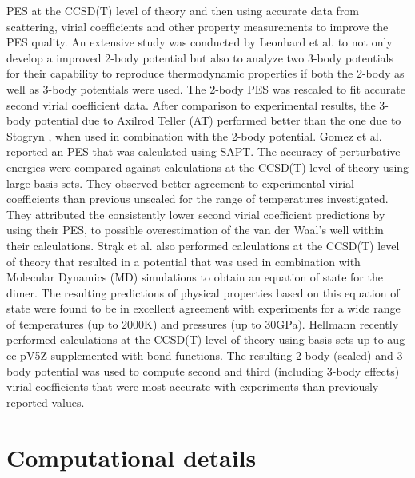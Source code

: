 \abinitio{} PES at the CCSD(T) level of theory and then using accurate data from scattering, virial coefficients and other property measurements to improve the PES quality. An extensive \abinitio{} study was conducted by Leonhard et al. \cite{Leonhard2002} to not only develop a improved 2-body potential but also to analyze two 3-body potentials for their capability to reproduce thermodynamic properties if both the 2-body as well as 3-body potentials were used. The 2-body \abinitio{} PES was rescaled to fit accurate second virial coefficient data. After comparison to experimental results, the 3-body potential due to Axilrod Teller (AT) \cite{Axilrod1943} performed better than the one due to Stogryn \cite{Stogryn1969}, when used in combination with the 2-body potential. Gomez et al. \cite{Gomez2007} reported an \abinitio{} PES that was calculated using SAPT. The accuracy of perturbative energies were compared against calculations at the CCSD(T) level of theory using large basis sets. They observed better agreement to experimental virial coefficients than previous unscaled \PESs{} for the range of temperatures investigated. They attributed the consistently lower second virial coefficient predictions by using their PES, to possible overestimation of the van der Waal's well within their calculations. Str\k{a}k et al. \cite{Strak2007} also performed \abinitio{} calculations at the CCSD(T) level of theory that resulted in a potential that was used in combination with Molecular Dynamics (MD) simulations to obtain an equation of state for the dimer. The resulting predictions of physical properties based on this equation of state were found to be in excellent agreement with experiments for a wide range of temperatures (up to 2000K) and pressures (up to 30GPa). Hellmann \cite{Hellmann2013} recently performed \abinitio{} calculations at the CCSD(T) level of theory using basis sets up to aug-cc-pV5Z supplemented with bond functions. The resulting 2-body (scaled) and 3-body potential was used to compute second and third (including 3-body effects) virial coefficients that were most accurate with experiments than previously reported values.
\section{Computational details}

